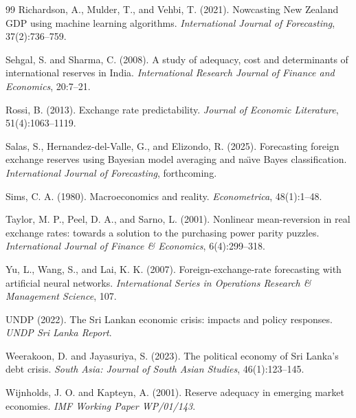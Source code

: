 \documentclass[12pt,a4paper]{article}
\begin{document}
\begin{thebibliography}{99}
Richardson, A., Mulder, T., and Vehbi, T. (2021).
\newblock Nowcasting New Zealand GDP using machine learning algorithms.
\newblock \textit{International Journal of Forecasting}, 37(2):736--759.

Sehgal, S. and Sharma, C. (2008).
\newblock A study of adequacy, cost and determinants of international reserves in India.
\newblock \textit{International Research Journal of Finance and Economics}, 20:7--21.

Rossi, B. (2013).
\newblock Exchange rate predictability.
\newblock \textit{Journal of Economic Literature}, 51(4):1063--1119.

Salas, S., Hernandez-del-Valle, G., and Elizondo, R. (2025).
\newblock Forecasting foreign exchange reserves using Bayesian model averaging and na\"{\i}ve Bayes classification.
\newblock \textit{International Journal of Forecasting}, forthcoming.

Sims, C. A. (1980).
\newblock Macroeconomics and reality.
\newblock \textit{Econometrica}, 48(1):1--48.

Taylor, M. P., Peel, D. A., and Sarno, L. (2001).
\newblock Nonlinear mean-reversion in real exchange rates: towards a solution to the purchasing power parity puzzles.
\newblock \textit{International Journal of Finance \& Economics}, 6(4):299--318.

Yu, L., Wang, S., and Lai, K. K. (2007).
\newblock Foreign-exchange-rate forecasting with artificial neural networks.
\newblock \textit{International Series in Operations Research \& Management Science}, 107.

UNDP (2022).
\newblock The Sri Lankan economic crisis: impacts and policy responses.
\newblock \textit{UNDP Sri Lanka Report}.

Weerakoon, D. and Jayasuriya, S. (2023).
\newblock The political economy of Sri Lanka's debt crisis.
\newblock \textit{South Asia: Journal of South Asian Studies}, 46(1):123--145.

Wijnholds, J. O. and Kapteyn, A. (2001).
\newblock Reserve adequacy in emerging market economies.
\newblock \textit{IMF Working Paper WP/01/143}.

\end{thebibliography}
\end{document}
